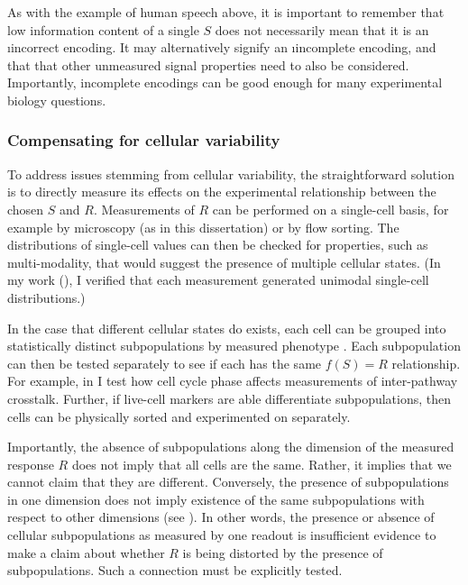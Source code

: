 As with the example of human speech above, 
it is important to remember that low information content of a
single $S$ does not
necessarily mean that it is an \i{incorrect}
encoding. It may alternatively signify an \i{incomplete} encoding,
and that that other unmeasured signal properties need to also be considered.
Importantly, incomplete encodings can be good enough for many
experimental biology questions.



\subsubsection{Compensating for cellular variability}


To address issues stemming from cellular variability, the
straightforward solution is to directly measure its effects on the
experimental relationship between the chosen $S$ and $R$. Measurements
of $R$ can be performed on a single-cell basis, for example by
microscopy (as in this dissertation) or by flow sorting.
The distributions of single-cell values can then be checked for properties,
such as multi-modality, that would suggest the presence of multiple
cellular states. (In my work (),
I verified that each measurement generated unimodal single-cell distributions.)


In the case that different cellular states do exists, each cell
can be grouped into statistically distinct subpopulations by measured
phenotype \cite{Loo2010,Singh2010}. Each subpopulation can then be
tested separately to see if each has the same $f(S)=R$ relationship.
For example, in  I test how cell cycle phase
affects measurements of inter-pathway crosstalk. Further, if live-cell markers
are able differentiate subpopulations, then cells can be physically
sorted and experimented on separately.


Importantly, the absence of subpopulations
along the dimension of the measured response $R$ does not imply that
all cells are the same. Rather, it implies that we cannot claim that they
are different. Conversely, the presence of subpopulations in one
dimension does not imply existence of the same subpopulations with respect
to other dimensions (see ). In other
words, the presence or absence of cellular subpopulations as measured
by one readout is insufficient evidence to make a claim about whether $R$
is being distorted by the presence of subpopulations. Such a connection
must be explicitly tested.


